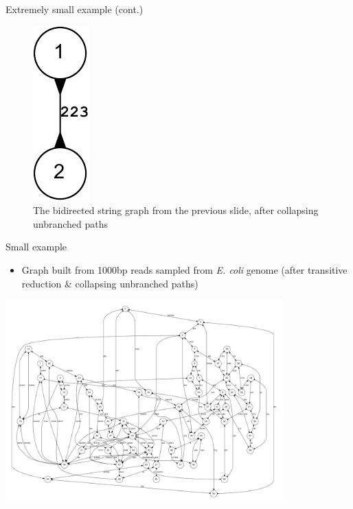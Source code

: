 \documentclass[xcolor=dvipsnames]{beamer}
\begin{document}
\begin{frame}{Extremely small example (cont.)}
    \begin{figure}[H]
        \includegraphics[scale=0.7]{example.reduced.mapped.collapsed.bidigraph-crop.pdf}
        \caption{The bidirected string graph from the previous slide, after
        collapsing unbranched paths}
    \end{figure}
\end{frame}

\begin{frame}{Small example}
    \begin{itemize}
        \item Graph built from 1000bp reads sampled from {\it E. coli} genome
            (after transitive reduction \& collapsing unbranched paths)
    \end{itemize}
    \begin{center}
        \includegraphics[width=0.8\textwidth]{E_coli.pdf}
    \end{center}
\end{frame}
\end{document}
